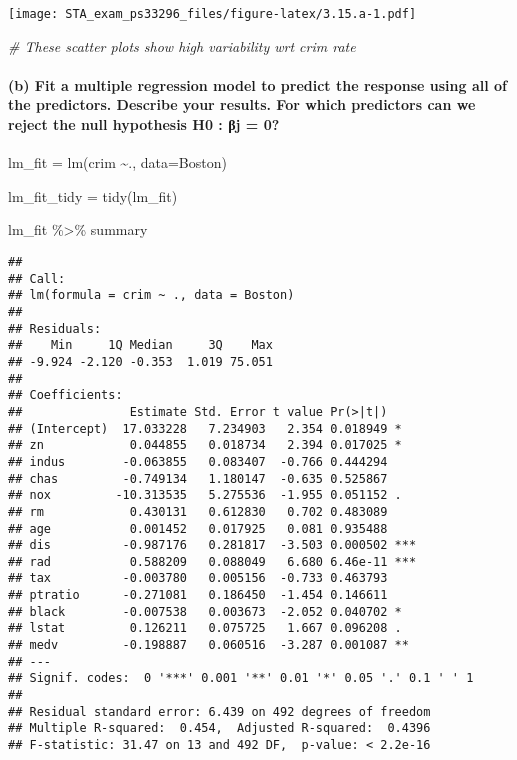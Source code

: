 \documentclass[
]{article}
\newenvironment{Shaded}{\begin{snugshade}}{\end{snugshade}}
\newcommand{\AttributeTok}[1]{\textcolor[rgb]{0.77,0.63,0.00}{#1}}
\newcommand{\CommentTok}[1]{\textcolor[rgb]{0.56,0.35,0.01}{\textit{#1}}}
\newcommand{\FunctionTok}[1]{\textcolor[rgb]{0.00,0.00,0.00}{#1}}
\newcommand{\NormalTok}[1]{#1}
\newcommand{\OtherTok}[1]{\textcolor[rgb]{0.56,0.35,0.01}{#1}}
\newcommand{\SpecialCharTok}[1]{\textcolor[rgb]{0.00,0.00,0.00}{#1}}
\begin{document}
\texttt{[image: STA\_exam\_ps33296\_files/figure-latex/3.15.a-1.pdf]}

\begin{Shaded}
\begin{Highlighting}[]
\CommentTok{\# These scatter plots show high variability wrt crim rate}
\end{Highlighting}
\end{Shaded}

\hypertarget{b-fit-a-multiple-regression-model-to-predict-the-response-using-all-of-the-predictors.-describe-your-results.-for-which-predictors-can-we-reject-the-null-hypothesis-h0-ux3b2j-0}{%
\paragraph{(b) Fit a multiple regression model to predict the response
using all of the predictors. Describe your results. For which predictors
can we reject the null hypothesis H0 : βj =
0?}\label{b-fit-a-multiple-regression-model-to-predict-the-response-using-all-of-the-predictors.-describe-your-results.-for-which-predictors-can-we-reject-the-null-hypothesis-h0-ux3b2j-0}}

\begin{Shaded}
\begin{Highlighting}[]
\NormalTok{lm\_fit }\OtherTok{=} \FunctionTok{lm}\NormalTok{(crim }\SpecialCharTok{\textasciitilde{}}\NormalTok{., }\AttributeTok{data=}\NormalTok{Boston) }

\NormalTok{lm\_fit\_tidy }\OtherTok{=} \FunctionTok{tidy}\NormalTok{(lm\_fit)}

\NormalTok{lm\_fit }\SpecialCharTok{\%\textgreater{}\%}\NormalTok{ summary}
\end{Highlighting}
\end{Shaded}

\begin{verbatim}
## 
## Call:
## lm(formula = crim ~ ., data = Boston)
## 
## Residuals:
##    Min     1Q Median     3Q    Max 
## -9.924 -2.120 -0.353  1.019 75.051 
## 
## Coefficients:
##               Estimate Std. Error t value Pr(>|t|)    
## (Intercept)  17.033228   7.234903   2.354 0.018949 *  
## zn            0.044855   0.018734   2.394 0.017025 *  
## indus        -0.063855   0.083407  -0.766 0.444294    
## chas         -0.749134   1.180147  -0.635 0.525867    
## nox         -10.313535   5.275536  -1.955 0.051152 .  
## rm            0.430131   0.612830   0.702 0.483089    
## age           0.001452   0.017925   0.081 0.935488    
## dis          -0.987176   0.281817  -3.503 0.000502 ***
## rad           0.588209   0.088049   6.680 6.46e-11 ***
## tax          -0.003780   0.005156  -0.733 0.463793    
## ptratio      -0.271081   0.186450  -1.454 0.146611    
## black        -0.007538   0.003673  -2.052 0.040702 *  
## lstat         0.126211   0.075725   1.667 0.096208 .  
## medv         -0.198887   0.060516  -3.287 0.001087 ** 
## ---
## Signif. codes:  0 '***' 0.001 '**' 0.01 '*' 0.05 '.' 0.1 ' ' 1
## 
## Residual standard error: 6.439 on 492 degrees of freedom
## Multiple R-squared:  0.454,  Adjusted R-squared:  0.4396 
## F-statistic: 31.47 on 13 and 492 DF,  p-value: < 2.2e-16
\end{verbatim}
\end{document}
